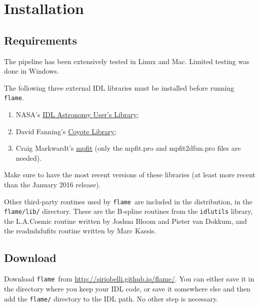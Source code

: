 \documentclass[a4paper]{article}
\newcommand{\flame}{\texttt{flame}}
\begin{document}
\section{Installation}
\label{sec:installation}


\subsection{Requirements}

The pipeline has been extensively tested in Linux and Mac. Limited testing was done in Windows.

The following three external IDL libraries must be installed before running \flame.
\begin{enumerate}
\item NASA's \href{http://idlastro.gsfc.nasa.gov/}{IDL Astronomy User's Library};
\item David Fanning's \href{http://www.idlcoyote.com/code_tips/installcoyote.php}{Coyote Library};
\item Craig Markwardt's \href{https://www.physics.wisc.edu/~craigm/idl/fitting.html}{mpfit} (only the mpfit.pro and mpfit2dfun.pro files are needed).
\end{enumerate}
Make sure to have the most recent versions of these libraries (at least more recent than the January 2016 release).

Other third-party routines used by \flame\ are included in the distribution, in the \texttt{flame/lib/} directory. These are the B-spline routines from the \texttt{idlutils} library, the L.A.Cosmic routine written by Joshua Bloom and Pieter van Dokkum, and the readmhdufits routine written by Marc Kassis.


\subsection{Download}

Download \flame\ from \url{http://siriobelli.github.io/flame/}. You can either save it in the directory where you keep your IDL code, or save it somewhere else and then add the \texttt{flame/} directory to the IDL path. No other step is necessary.





\end{document}
